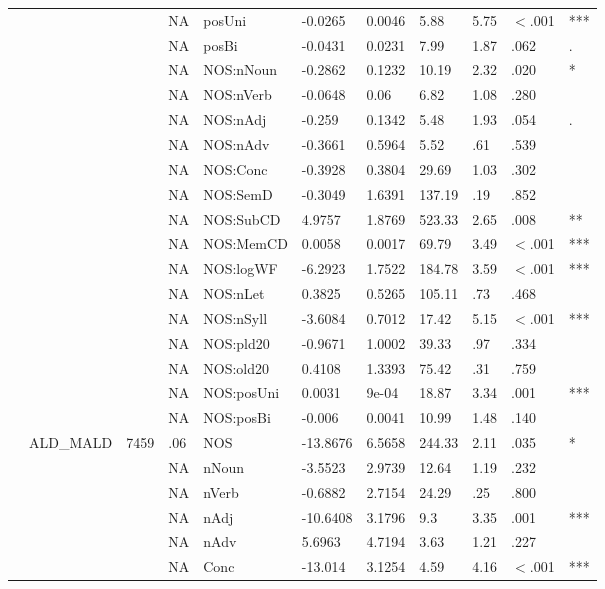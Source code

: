 \begin{table}[ht]
\begin{tabular}{lllllllllll}
   &  &  & NA & posUni & -0.0265 & 0.0046 & 5.88 & 5.75 & $<$.001 & *** \\ 
   &  &  & NA & posBi & -0.0431 & 0.0231 & 7.99 & 1.87 & .062 & . \\ 
   &  &  & NA & NOS:nNoun & -0.2862 & 0.1232 & 10.19 & 2.32 & .020 & * \\ 
   &  &  & NA & NOS:nVerb & -0.0648 & 0.06 & 6.82 & 1.08 & .280 &   \\ 
   &  &  & NA & NOS:nAdj & -0.259 & 0.1342 & 5.48 & 1.93 & .054 & . \\ 
   &  &  & NA & NOS:nAdv & -0.3661 & 0.5964 & 5.52 & .61 & .539 &   \\ 
   &  &  & NA & NOS:Conc & -0.3928 & 0.3804 & 29.69 & 1.03 & .302 &   \\ 
   &  &  & NA & NOS:SemD & -0.3049 & 1.6391 & 137.19 & .19 & .852 &   \\ 
   &  &  & NA & NOS:SubCD & 4.9757 & 1.8769 & 523.33 & 2.65 & .008 & ** \\ 
   &  &  & NA & NOS:MemCD & 0.0058 & 0.0017 & 69.79 & 3.49 & $<$.001 & *** \\ 
   &  &  & NA & NOS:logWF & -6.2923 & 1.7522 & 184.78 & 3.59 & $<$.001 & *** \\ 
   &  &  & NA & NOS:nLet & 0.3825 & 0.5265 & 105.11 & .73 & .468 &   \\ 
   &  &  & NA & NOS:nSyll & -3.6084 & 0.7012 & 17.42 & 5.15 & $<$.001 & *** \\ 
   &  &  & NA & NOS:pld20 & -0.9671 & 1.0002 & 39.33 & .97 & .334 &   \\ 
   &  &  & NA & NOS:old20 & 0.4108 & 1.3393 & 75.42 & .31 & .759 &   \\ 
   &  &  & NA & NOS:posUni & 0.0031 & 9e-04 & 18.87 & 3.34 & .001 & *** \\ 
   &  &  & NA & NOS:posBi & -0.006 & 0.0041 & 10.99 & 1.48 & .140 &   \\ 
   & ALD\_MALD & 7459 & .06 & NOS & -13.8676 & 6.5658 & 244.33 & 2.11 & .035 & * \\ 
   &  &  & NA & nNoun & -3.5523 & 2.9739 & 12.64 & 1.19 & .232 &   \\ 
   &  &  & NA & nVerb & -0.6882 & 2.7154 & 24.29 & .25 & .800 &   \\ 
   &  &  & NA & nAdj & -10.6408 & 3.1796 & 9.3 & 3.35 & .001 & *** \\ 
   &  &  & NA & nAdv & 5.6963 & 4.7194 & 3.63 & 1.21 & .227 &   \\ 
   &  &  & NA & Conc & -13.014 & 3.1254 & 4.59 & 4.16 & $<$.001 & *** \\ 

\end{tabular}
\end{table}
